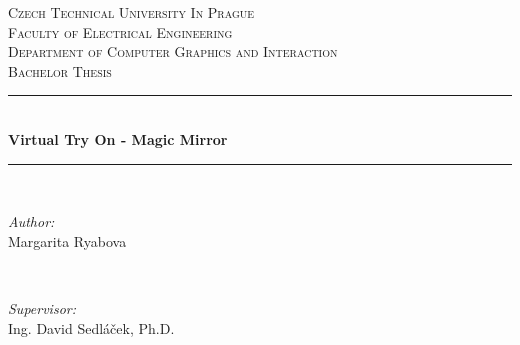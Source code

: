 \documentclass[a4paper]{report}
\begin{document}

%

\begin{titlepage}

\newcommand{\HRule}{\rule{\linewidth}{0.5mm}} %

\center %
 

\textsc{\LARGE Czech Technical University In Prague}\\[0.5cm] %
\textsc{\large Faculty of Electrical Engineering}\\[0.5cm] %
\textsc{\large Department of Computer Graphics and Interaction}\\[1.5cm] %
\textsc{\Large Bachelor Thesis}\\[0.5cm] %


\HRule \\[0.4cm]
{ \huge \bfseries Virtual Try On - Magic Mirror}\\[0.4cm] %
\HRule \\[1.5cm]
 

\begin{minipage}{0.4\textwidth}
\begin{flushleft} \large
\emph{Author:}\\
Margarita {Ryabova}  \\
\end{flushleft}
\end{minipage}
~
\begin{minipage}{0.5\textwidth}
\begin{flushright} \large
\emph{Supervisor:} \\
Ing. David Sedláček, Ph.D. \\
\end{flushright}
\end{minipage}\\[2cm]


\end{titlepage}
\end{document}
